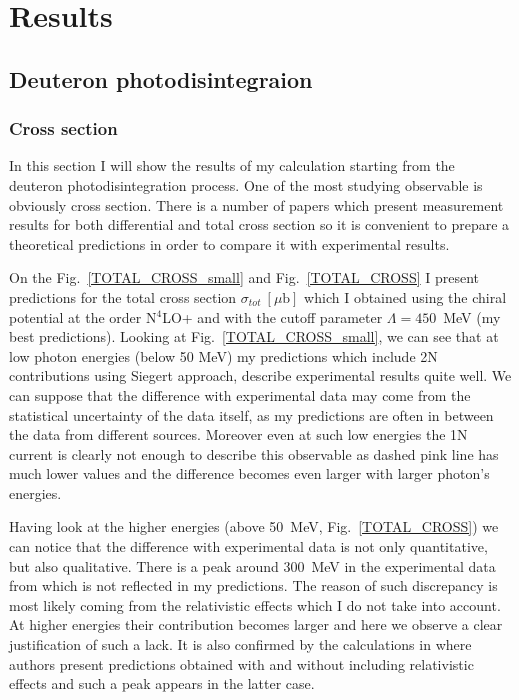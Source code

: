\chapter{Results}

\section{Deuteron photodisintegraion}

    \subsection{Cross section}
    \label{cross_results}

    In this section I will show the results of my calculation starting from the
    deuteron photodisintegration process. One of the most
    studying observable is obviously cross section. There is
    a number of papers which present 
    measurement results for both differential and total cross section
    \cite{BOSMAN1979,ARENDS1984,Skopik1974, Moreh1989, Birenbaum1985, Bernabei1986, rachek2007,Ying_Experiment_Deut, DeSanctis_Experiment_Deut} so it is convenient 
    to prepare a theoretical predictions in order to compare 
    it with experimental results.

    On the Fig.~\ref{TOTAL_CROSS_small} and Fig.~\ref{TOTAL_CROSS} 
    I present predictions for the
    total cross section $\sigma_{tot}~[\mu\text{b}]$ which I obtained
    using the chiral potential at the order N$^4$LO+ and with 
    the cutoff parameter $\Lambda=450$~MeV (my best predictions).
    Looking at Fig.~\ref{TOTAL_CROSS_small}, we can see that at low photon energies
    (below 50 MeV) my predictions which include 2N contributions
    using Siegert approach, describe experimental results quite well.
    We can suppose that the difference with experimental data may come from 
    the statistical uncertainty of  the data itself, as my predictions
    are often in between the data from different sources.
    Moreover even at such low energies the 1N current is clearly not enough
    to describe this observable as dashed pink line has much lower values and
    the difference becomes even larger with larger photon's energies. 

    Having look at the higher energies (above 50~MeV, Fig.~\ref{TOTAL_CROSS})
    we can notice that the difference with experimental data is not only 
    quantitative, but also qualitative.  There is a peak around 300~MeV
    in the experimental data from \cite{Bernabei1986} which is not
    reflected in my predictions. The reason of such discrepancy 
    is most likely coming from the relativistic effects
    which I do not take into account. At higher energies their contribution
    becomes larger and here we observe a clear justification of such a lack.
    It is also confirmed by the calculations in \cite{ArenhovelPhotodisint1991}
    where authors present predictions obtained with and without including
    relativistic effects and such a peak appears in the latter case. 
    
